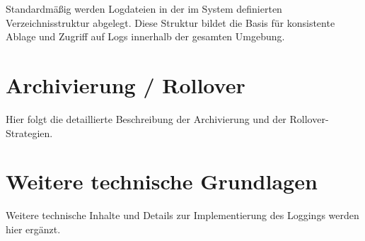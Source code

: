 Standardmäßig werden Logdateien in der im System definierten Verzeichnisstruktur abgelegt.  
Diese Struktur bildet die Basis für konsistente Ablage und Zugriff auf Logs innerhalb der gesamten Umgebung.

\section{Archivierung / Rollover}

Hier folgt die detaillierte Beschreibung der Archivierung und der Rollover-Strategien.

\section{Weitere technische Grundlagen}

Weitere technische Inhalte und Details zur Implementierung des Loggings werden hier ergänzt.